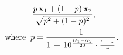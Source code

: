 \documentclass[10pt,twocolumn,letterpaper]{article}
\begin{document}

\begin{equation}
\label{eqn:mixsound}
\begin{split}
  \frac{p \, {\bf x}_1 + (1-p) \, {\bf x}_2}{\sqrt{p^2 + (1-p)^2}}, \hspace{10mm} \\ 
  {\rm where} \;\; p = \frac{1}{1\,+\, 10^{\frac{G_1-G_2}{20}} \cdot \frac{1\,-\,r}{r}}.
\end{split}
\end{equation}
\end{document}
